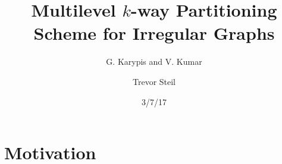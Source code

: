 \documentclass{beamer}
\title{Multilevel $k$-way Partitioning Scheme for Irregular Graphs}
\subtitle{G. Karypis and V. Kumar}
\date{3/7/17}
\author{Trevor Steil}
\begin{document}
\begin{frame}
  \titlepage
\end{frame}

\begin{frame}
  \tableofcontents
\end{frame}

\section{Motivation}
\begin{frame}
\end{frame}
\end{document}
